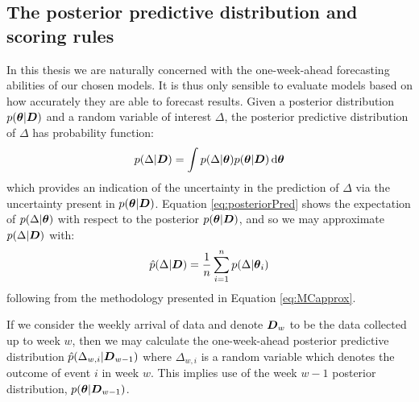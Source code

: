\subsection{The posterior predictive distribution and scoring rules}

In this thesis we are naturally concerned with the one-week-ahead forecasting abilities of our chosen models. It is thus
only sensible to evaluate models based on how accurately they are able to forecast results. Given a posterior distribution
\(p(\boldsymbol{\theta} | \boldsymbol{D})\) and a random variable of interest \(\Delta\), the posterior predictive distribution of
\(\Delta\) has probability function:
\begin{align} 
\label{eq:posteriorPred}
p(\Delta | \boldsymbol{D}) = \int p(\Delta | \boldsymbol{\theta}) p(\boldsymbol{\theta} | \boldsymbol{D}) \, \mathrm{d}\boldsymbol{\theta}
\end{align}
which provides an indication of the uncertainty in the prediction of \(\Delta\) via the uncertainty present in
\(p(\boldsymbol{\theta} | \boldsymbol{D})\). Equation \eqref{eq:posteriorPred} shows the expectation of \(p(\Delta | \boldsymbol{\theta})\) with
respect to the posterior \(p(\boldsymbol{\theta} | \boldsymbol{D})\), and so we may approximate \(p(\Delta | \boldsymbol{D})\) with:
\begin{align} 
\hat{p}(\Delta | \boldsymbol{D}) = \frac{1}{n} \sum_{i=1}^{n} p(\Delta | \boldsymbol{\theta}_i)
\end{align}
following from the methodology presented in Equation \eqref{eq:MCapprox}.

If we consider the weekly arrival of data and denote \(\boldsymbol{D}_w\) to be the data collected up to week \(w\), then we may
calculate the one-week-ahead posterior predictive distribution \(\hat{p}(\Delta_{w, i} | \boldsymbol{D}_{w-1})\) where
\(\Delta_{w, i}\) is a random variable which denotes the outcome of event \(i\) in week \(w\). This implies use of the
week \(w-1\) posterior distribution, \(p(\boldsymbol{\theta} | \boldsymbol{D}_{w-1})\).

